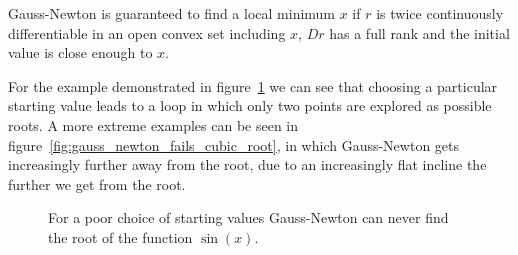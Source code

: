 Gauss-Newton is guaranteed to find a local minimum $x$ if $r$ is twice continuously\\ differentiable in an open convex set including $x$, $Dr$ has a full rank and the initial value is close enough to $x$.

For the example demonstrated in figure~\ref{fig:gauss_newton_fails_sin} we can see that choosing a particular starting value leads to a loop in which only two points are explored as possible roots. A more extreme examples can be seen in figure~\ref{fig:gauss_newton_fails_cubic_root}, in which Gauss-Newton gets increasingly further away from the root, due to an increasingly flat incline the further we get from the root.

\begin{figure}[h!]
	\centering
	\caption{For a poor choice of starting values Gauss-Newton can never find the root of the function $\sin(x)$.}
	\label{fig:gauss_newton_fails_sin}
\end{figure}

